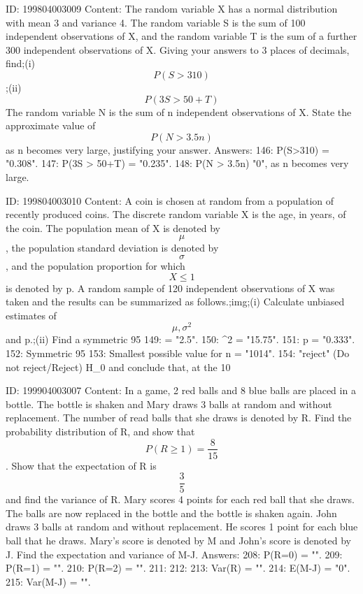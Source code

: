\documentclass{article}
\begin{document}
ID: 199804003009
Content:
The random variable X has a normal distribution with mean 3 and variance 4. The random variable S is the sum of 100 independent observations of X, and the random variable T is the sum of a further 300 independent observations of X. Giving your answers to 3 places of decimals, find;(i) $$P(S > 310)$$;(ii) $$P(3S > 50+T)$$ The random variable N is the sum of n independent observations of X. State the approximate value of $$P(N > 3.5n)$$ as n becomes very large, justifying your answer.  Answers:
146: P(S>310) = "0.308".
147: P(3S > 50+T) = "0.235".
148: P(N > 3.5n) \approx "0", as n becomes very large.

ID: 199804003010
Content:
A coin is chosen at random from a population of recently produced coins. The discrete random variable X is the age, in years, of the coin. The population mean of X is denoted by $$\mu$$, the population standard deviation is denoted by $$\sigma$$, and the population proportion for which $$X \leq 1 $$is denoted by p. A random sample of 120 independent observations of X was taken and the results can be summarized as follows.;img;(i) Calculate unbiased estimates of $$\mu, \sigma^2$$ and p.;(ii) Find a symmetric 95%
149: \mu = "2.5".
150: \sigma^2 = "15.75".
151: p = "0.333".
152: Symmetric 95%
153: Smallest possible value for n = "1014".
154: "reject" (Do not reject/Reject) H_0 and conclude that, at the 10%

ID: 199904003007
Content:
In a game, 2 red balls and 8 blue balls are placed in a bottle. The bottle is shaken and Mary draws 3 balls at random and without replacement. The number of read balls that she draws is denoted by R. Find the probability distribution of R, and show that $$P(R \geq 1) = \frac{8}{15}$$.  Show that the expectation of R is $$\frac{3}{5}$$ and find the variance of R.  Mary scores 4 points for each red ball that she draws. The balls are now replaced in the bottle and the bottle is shaken again. John draws 3 balls at random and without replacement. He scores 1 point for each blue ball that he draws. Mary's score is denoted by M and John's score is denoted by J. Find the expectation and variance of M-J. Answers:
208: P(R=0) = "".
209: P(R=1) = "".
210: P(R=2) = "".
211: 
212: 
213: Var(R) = "".
214: E(M-J) = "0".
215: Var(M-J) = "".
\end{document}
